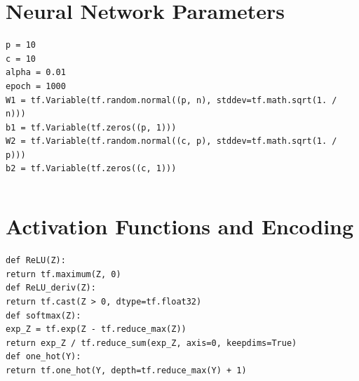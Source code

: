     \vspace{-.3cm}

\newpage
\vspace{-.3cm}
\section{Neural Network Parameters}
\vspace{-.9cm}
\begin{code}
\begin{lstlisting}
p = 10
c = 10
alpha = 0.01
epoch = 1000
W1 = tf.Variable(tf.random.normal((p, n), stddev=tf.math.sqrt(1. / n)))
b1 = tf.Variable(tf.zeros((p, 1)))
W2 = tf.Variable(tf.random.normal((c, p), stddev=tf.math.sqrt(1. / p)))
b2 = tf.Variable(tf.zeros((c, 1)))  
\end{lstlisting}
\end{code}

\vspace{-1cm}
\begin{verbatim}
\end{verbatim}

\vspace{-.75cm}
\section{ Activation Functions and Encoding}
\vspace{-.6cm}
\begin{code}
\begin{lstlisting}
def ReLU(Z):
return tf.maximum(Z, 0)
def ReLU_deriv(Z):
return tf.cast(Z > 0, dtype=tf.float32)
def softmax(Z):
exp_Z = tf.exp(Z - tf.reduce_max(Z))
return exp_Z / tf.reduce_sum(exp_Z, axis=0, keepdims=True)
def one_hot(Y):
return tf.one_hot(Y, depth=tf.reduce_max(Y) + 1)
\end{lstlisting}
\end{code}
\vspace{-.75cm}
\begin{verbatim}

\end{verbatim}
\vspace{-.75cm}
